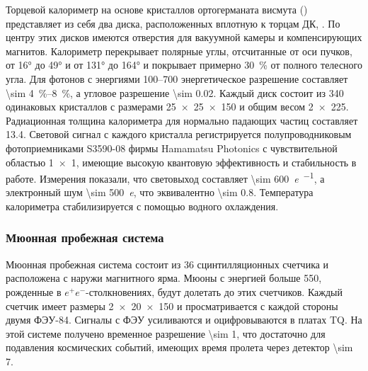 Торцевой калориметр на основе кристаллов ортогерманата висмута  () представляет из себя два диска, расположенных вплотную к торцам ДК, \cite{BGOAkhmetshin2009}.
По центру этих дисков имеются отверстия для вакуумной камеры и компенсирующих магнитов.
Калориметр перекрывает полярные углы,
отсчитанные от оси пучков,
от \ang{16} до \ang{49} и от \ang{131} до \ang{164} и покрывает примерно \SI{30}{\percent} от полного телесного угла.
Для фотонов с энергиями 
\SIrange[range-phrase = --, range-units = single]{100}{700}{\MeVr}
энергетическое разрешение составляет 
\SIrange[range-phrase = --, range-units = single]{\sim 4}{8}{\percent},
а угловое разрешение \SI{\sim 0.02}{\radianru}.
Каждый диск состоит из \num{340} одинаковых кристаллов с размерами
\SI[product-units = power]{25 x 25 x 150}{\mmr}
и общим весом
\SI[product-units = single]{2 x 225}{\kgr}. 
Радиационная толщина калориметра для нормально падающих частиц составляет \SI{13.4}{\Xrad}.
Световой сигнал с каждого кристалла регистрируется полупроводниковым фотоприемниками S3590-08 фирмы Hamamatsu Photonics
с чувствительной областью \SI[product-units = power]{1 x 1}{\cmr},
имеющие высокую квантовую эффективность и стабильность в работе. 
Измерения показали,
что световыход составляет \SI{\sim 600}{\elementarycharge\per\MeVr},
а электронный шум \SI{\sim 500}{\elementarycharge},
что эквивалентно \SI{\sim 0.8}{\MeVr}.
Температура калориметра стабилизируется с помощью водного охлаждения.




\subsubsection{Мюонная пробежная система}\label{sec:mu}

Мюонная пробежная система состоит из \num{36} сцинтилляционных счетчика и расположена с наружи магнитного ярма.
Мюоны с энергией больше \SI{550}{\MeVr},
рожденные в $e^+e^-$-столкновениях,
будут долетать до этих счетчиков. 
Каждый счетчик имеет размеры \SI[product-units = power]{2 x 20 x 150}{\cmr} и просматривается с каждой стороны двумя ФЭУ-84.
Сигналы с ФЭУ усиливаются и оцифровываются в платах TQ. 
На этой системе получено временное разрешение \SI{\sim 1}{\nsr}, что достаточно для подавления космических событий, имеющих время пролета через детектор \SI{\sim 7}{\nsr}.



